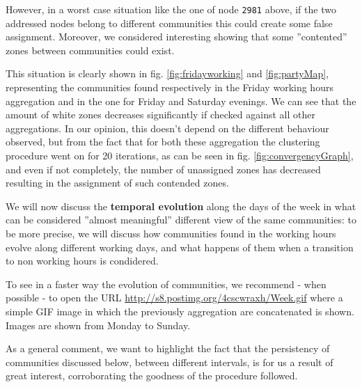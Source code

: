 \documentclass[12pt,a4paper]{article}
\begin{document}
However, in a worst case situation like the one of node \texttt{2981} above, if the two addressed nodes belong to different communities this could create some false assignment. Moreover, we considered interesting showing that some ''contented'' zones between communities could exist.

This situation is clearly shown in fig. \ref{fig:fridayworking} and \ref{fig:partyMap}, representing the communities found respectively in the Friday working hours aggregation and in the one for Friday and Saturday evenings. We can see that the amount of white zones decreases significantly if checked against all other aggregations. In our opinion, this doesn't depend on the different behaviour observed, but from the fact that for both these aggregation the clustering procedure went on for 20 iterations, as can be seen in fig. \ref{fig:convergencyGraph}, and even if not completely, the number of unassigned zones has decreased resulting in the assignment of such contended zones.

We will now discuss the \textbf{temporal evolution} along the days of the week in what can be considered ''almost meaningful'' different view of the same communities: to be more precise, we will discuss how communities found in the working hours evolve along different working days, and what happens of them when a transition to non working hours is condidered.

To see in a faster way the evolution of communities, we recommend - when possible - to open the URL \href{http://s8.postimg.org/4cscwraxh/Week.gif}{http://s8.postimg.org/4cscwraxh/Week.gif} where a simple GIF image in which the previously aggregation are concatenated is shown. Images are shown from Monday to Sunday.

As a general comment, we want to highlight the fact that the persistency of communities discussed below, between different intervals, is for us a result of great interest, corroborating the goodness of the procedure followed.
\end{document}
